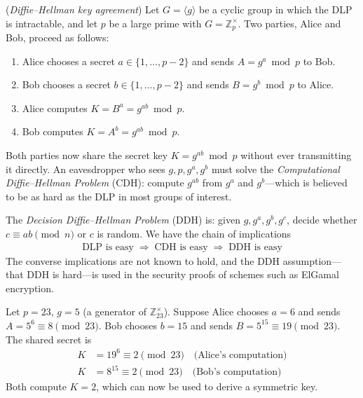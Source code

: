 \documentclass[a4paper, 12pt]{book} %
\begin{document}
\begin{theorem}
    (\emph{Diffie--Hellman key agreement}) Let $G = \langle g \rangle$ be a cyclic group in which the DLP is intractable, and let $p$ be a large prime with $G = \mathbb{Z}_p^\times$. Two parties, Alice and Bob, proceed as follows:
    \begin{enumerate}
        \item Alice chooses a secret $a \in \{1, \ldots, p-2\}$ and sends $A = g^a \bmod p$ to Bob.
        \item Bob chooses a secret $b \in \{1, \ldots, p-2\}$ and sends $B = g^b \bmod p$ to Alice.
        \item Alice computes $K = B^a = g^{ab} \bmod p$.
        \item Bob computes $K = A^b = g^{ab} \bmod p$.
    \end{enumerate}
    Both parties now share the secret key $K = g^{ab} \bmod p$ without ever transmitting it directly. An eavesdropper who sees $g, p, g^a, g^b$ must solve the \emph{Computational Diffie--Hellman Problem} (CDH): compute $g^{ab}$ from $g^a$ and $g^b$---which is believed to be as hard as the DLP in most groups of interest.
\end{theorem}

\begin{proposition}
    The \emph{Decision Diffie--Hellman Problem} (DDH) is: given $g, g^a, g^b, g^c$, decide whether $c \equiv ab \pmod{n}$ or $c$ is random. We have the chain of implications
    \begin{align}
        \text{DLP is easy} \;\Longrightarrow\; \text{CDH is easy} \;\Longrightarrow\; \text{DDH is easy}
    \end{align}
    The converse implications are not known to hold, and the DDH assumption—that DDH is hard—is used in the security proofs of schemes such as ElGamal encryption.
\end{proposition}

\begin{example}
    Let $p = 23$, $g = 5$ (a generator of $\mathbb{Z}_{23}^\times$). Suppose Alice chooses $a = 6$ and sends $A = 5^6 \equiv 8 \pmod{23}$. Bob chooses $b = 15$ and sends $B = 5^{15} \equiv 19 \pmod{23}$. The shared secret is
    \begin{align}
        K &= 19^6 \equiv 2 \pmod{23} \quad \text{(Alice's computation)} \\
        K &= 8^{15} \equiv 2 \pmod{23} \quad \text{(Bob's computation)}
    \end{align}
    Both compute $K = 2$, which can now be used to derive a symmetric key.
\end{example}
\end{document}
